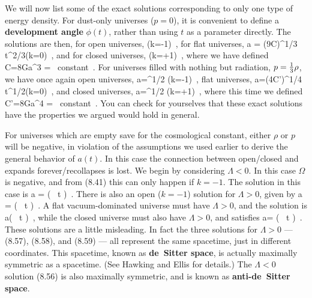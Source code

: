 We will now list some of the exact solutions corresponding to 
only one type of energy density.
For dust-only universes ($p=0$), it is convenient to define
a {\bf development angle} $\phi(t)$, rather than using $t$ as
a parameter directly.  The solutions are then, for open
universes,
\be
  \qquad (k=-1)\ ,\label{8.48}
\ee
for flat universes,
\be
  a = \left({{9C}}\right)^{1/3} t^{2/3}\qquad (k=0)\ ,
  \label{8.49}
\ee
and for closed universes,
\be
  \qquad (k=+1)\ ,\label{8.50}
\ee
where we have defined
\be
  C={{8\pi G}}\rho a^3 = {\rm ~constant}\ .\label{8.51}
\ee
For universes filled with nothing but radiation, $p={1\over 3}\rho$,
we have once again open universes,
\be
  a=^{1/2}
  \qquad (k=-1)\ ,\label{8.52}
\ee
flat universes,
\be
  a=(4C')^{1/4} t^{1/2}\qquad (k=0)\ ,\label{8.53}
\ee
and closed universes,
\be
  a=^{1/2}
  \qquad (k=+1)\ ,\label{8.54}
\ee
where this time we defined
\be
  C'={{8\pi G}}\rho a^4 = {\rm ~constant}\ .\label{8.55}
\ee
You can check for yourselves that these exact solutions have 
the properties we argued would hold in general.

For universes which are empty save for the cosmological constant,
either $\rho$ or $p$ will be negative, in violation of the 
assumptions we used earlier to derive the general behavior of
$a(t)$.  In this case the connection between open/closed and 
expands forever/recollapses is lost.  We begin by considering
$\Lambda<0$.  In this case $\Omega$
is negative, and from (8.41) this can only happen if $k=-1$.
The solution in this case is
\be
  a = \sin\left( \, t
  \right)\ .\label{8.56}
\ee
There is also an open ($k=-1$) solution for $\Lambda>0$, given by
\be
  a = \sinh\left( \, t
  \right)\ .\label{8.57}
\ee
A flat vacuum-dominated universe must have $\Lambda>0$, and the
solution is
\be
  a\propto \exp\left(\pm{} \, t
  \right)\ ,\label{8.58}
\ee
while the closed universe must also have $\Lambda>0$, and satisfies
\be
  a= \cosh\left( \, t
  \right)\ .\label{8.59}
\ee
These solutions are a little misleading.  In fact the three
solutions for $\Lambda>0$ --- (8.57), (8.58), and (8.59) ---
all represent the same spacetime, just in different coordinates.
This spacetime, known as {\bf de~Sitter space}, is actually
maximally symmetric as a spacetime.  (See Hawking and Ellis for
details.)  The $\Lambda<0$ solution (8.56) is
also maximally symmetric, and is known as {\bf anti-de~Sitter space}.


